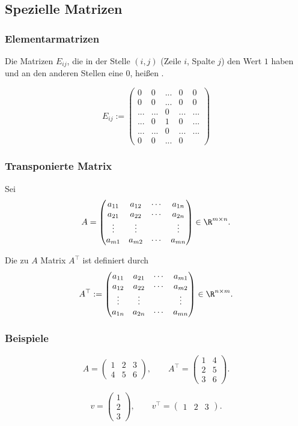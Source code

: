\subsection{Spezielle Matrizen}
\makeSectionDividerPage
%
\begin{frame}\frametitle{Elementarmatrizen}
Die Matrizen $E_{ij}$, die in der Stelle $(i,j)$ (Zeile $i$, Spalte $j$) den Wert $1$ haben und an den anderen Stellen eine $0$, heißen .
			
$$
E_{ij}:=\begin{pmatrix}
0 & 0& ... &0& 0\\
0 & 0& ... &0& 0\\
...&...&0&...&...\\
...& 0& 1 &0& ...\\
...&...&0&...&...\\
0& 0&...& 0
\end{pmatrix}
$$

\end{frame}
%
\begin{frame}\frametitle{Transponierte Matrix}
	
	Sei
	$$
		A = 
			\begin{pmatrix}
				a_{11}	&a_{12}	&\cdots	&a_{1n}\\
				a_{21} 	&a_{22} 	&\cdots 	&a_{2n}\\
				\vdots 	&\vdots   	&            	&\vdots \\
				a_{m1} 	&a_{m2} 	&\cdots 	&a_{mn}
			\end{pmatrix}
			\in \R^{m\times n}.
	$$
	
	\vspace{3mm}
	Die zu $A$   Matrix $A^{\top}$ ist definiert durch
	$$
	A^{\top} := 
			\begin{pmatrix}
				a_{11}	&a_{21}	&\cdots	&a_{m1}\\
				a_{12} 	&a_{22} 	&\cdots 	&a_{m2}\\
				\vdots 	&\vdots   	&            	&\vdots \\
				a_{1n} 	&a_{2n} 	&\cdots 	&a_{mn}
			\end{pmatrix}
			\in \R^{n\times m}.
	$$
	
\end{frame}
%
%
\begin{frame}\frametitle{Beispiele}

	$$
		A =
		\begin{pmatrix}
			1	&2	&3	\\
			4	&5	&6	
		\end{pmatrix},
		\qquad
		A^{\top} =
		\begin{pmatrix}
			1	&4	\\
			2	&5	\\
			3	&6	
		\end{pmatrix}.
	$$
	
	$$
		v = 
		\begin{pmatrix}
			1	\\
			2	\\
			3
		\end{pmatrix},
		\qquad
		v^{\top} =
		\begin{pmatrix}
			1	&2	&3
		\end{pmatrix}
		.
	$$
\end{frame}
